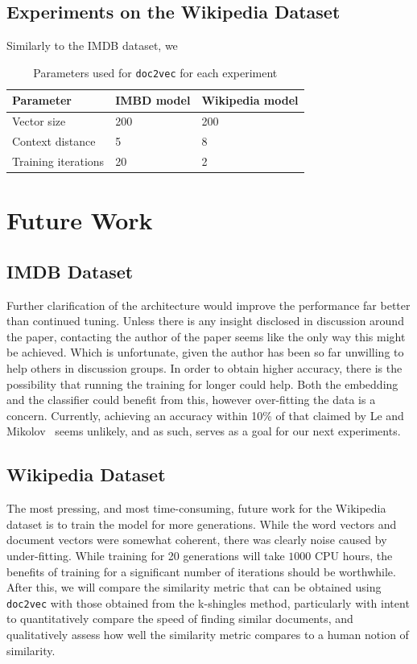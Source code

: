 \documentclass[11pt]{article}
\begin{document}
  \subsection*{Experiments on the Wikipedia Dataset}
    Similarly to the IMDB dataset, we

  \begin{table}
    \begin{center}
      \begin{tabular}{l l l}
        Parameter & IMBD model & Wikipedia model\\
        \hline
        Vector size & 200 & 200\\
        Context distance & 5 & 8\\
        Training iterations & 20 & 2\\
      \end{tabular}
    \caption{Parameters used for \texttt{doc2vec} for each experiment}
    \label{tab:params}
    \end{center}
  \end{table}

\section*{Future Work}
  \subsection*{IMDB Dataset}
    Further clarification of the architecture would improve the performance far better
    than continued tuning. Unless there is any insight disclosed in discussion around
    the paper, contacting the author of the paper seems like the only way this might be
    achieved. Which is unfortunate, given the author has been so far unwilling to
    help others in discussion groups.
    In order to obtain higher accuracy, there is the possibility that running the
    training for longer could help. Both the embedding and the classifier could benefit
    from this, however over-fitting the data is a concern.
    Currently, achieving an accuracy within 10\% of that claimed by Le
    and Mikolov~\cite{le2014distributed} seems unlikely, and as such, serves as
    a goal for our next experiments.

  \subsection*{Wikipedia Dataset}
    The most pressing, and most time-consuming, future work for the Wikipedia dataset
    is to train the model for more generations. While the word vectors and document
    vectors were somewhat coherent, there was clearly noise caused by under-fitting.
    While training for 20 generations will take $1000$ CPU hours, the benefits of
    training for a significant number of iterations should be worthwhile.\\
    After this, we will compare the similarity metric that can be obtained using
    \texttt{doc2vec} with those obtained from the k-shingles method, particularly
    with intent to quantitatively compare the speed of finding similar documents, and
    qualitatively assess how well the similarity metric compares to a human notion of
    similarity.
\end{document}
